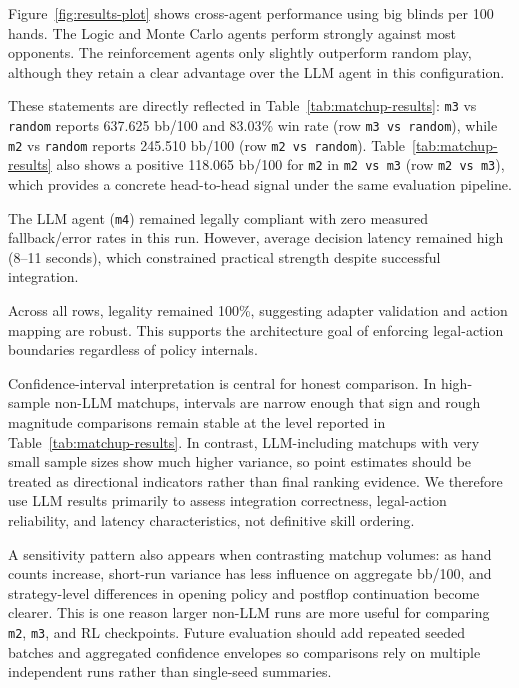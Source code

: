 \documentclass[11pt]{article}
\begin{document}
Figure~\ref{fig:results-plot} shows cross-agent performance using big blinds per 100 hands. The Logic and Monte Carlo agents perform strongly against most opponents. The reinforcement agents only slightly outperform random play, although they retain a clear advantage over the LLM agent in this configuration.

These statements are directly reflected in Table~\ref{tab:matchup-results}: \texttt{m3} vs \texttt{random} reports 637.625 bb/100 and 83.03\% win rate (row \texttt{m3 vs random}), while \texttt{m2} vs \texttt{random} reports 245.510 bb/100 (row \texttt{m2 vs random}). Table~\ref{tab:matchup-results} also shows a positive 118.065 bb/100 for \texttt{m2} in \texttt{m2 vs m3} (row \texttt{m2 vs m3}), which provides a concrete head-to-head signal under the same evaluation pipeline.

The LLM agent (\texttt{m4}) remained legally compliant with zero measured fallback/error rates in this run. However, average decision latency remained high (8--11 seconds), which constrained practical strength despite successful integration.

Across all rows, legality remained 100\%, suggesting adapter validation and action mapping are robust. This supports the architecture goal of enforcing legal-action boundaries regardless of policy internals.

Confidence-interval interpretation is central for honest comparison. In high-sample non-LLM matchups, intervals are narrow enough that sign and rough magnitude comparisons remain stable at the level reported in Table~\ref{tab:matchup-results}. In contrast, LLM-including matchups with very small sample sizes show much higher variance, so point estimates should be treated as directional indicators rather than final ranking evidence. We therefore use LLM results primarily to assess integration correctness, legal-action reliability, and latency characteristics, not definitive skill ordering.

A sensitivity pattern also appears when contrasting matchup volumes: as hand counts increase, short-run variance has less influence on aggregate bb/100, and strategy-level differences in opening policy and postflop continuation become clearer. This is one reason larger non-LLM runs are more useful for comparing \texttt{m2}, \texttt{m3}, and RL checkpoints. Future evaluation should add repeated seeded batches and aggregated confidence envelopes so comparisons rely on multiple independent runs rather than single-seed summaries.
\end{document}
